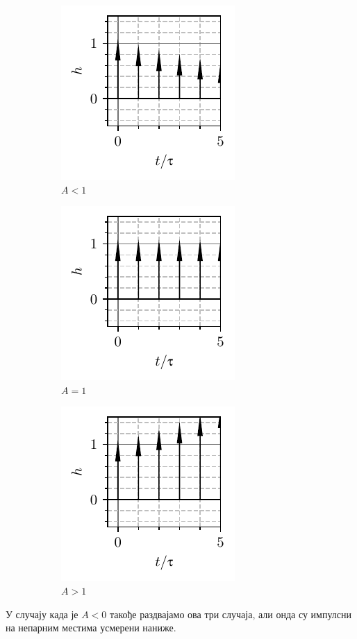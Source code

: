 \begin{figure}[ht!]
    \hspace*{0pt}\hfill
    \begin{subfigure}[c]{0.33\textwidth}
        \centering
        \includegraphics[scale=1]{fig/delay_s1.pdf}
        \caption{$A < 1$}
    \end{subfigure}
    \hspace*{0pt}\hfill
    \begin{subfigure}[c]{0.3\textwidth}
        \centering
        \includegraphics[scale=1]{fig/delay_s2.pdf}
        \caption{$A = 1$}
    \end{subfigure}
    \hfill
    \hspace*{0pt}
    \hspace*{0pt}\hfill
    \begin{subfigure}[c]{0.3\textwidth}
        \centering
        \includegraphics[scale=1]{fig/delay_s3.pdf}
        \caption{$A > 1$}
    \end{subfigure}
    \caption{}
\end{figure}
У случају када је $A < 0$ такође раздвајамо ова три случаја, али онда су импулсни на непарним местима усмерени наниже.

